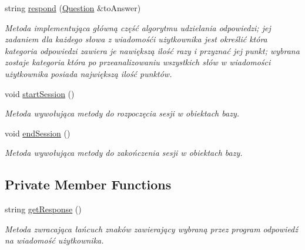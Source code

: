 \begin{DoxyCompactItemize}
$$string \mbox{\hyperlink{class_bot_a480543fe4ce73868ce89217cc1d0e8a8}{respond}} (\mbox{\hyperlink{class_question}{Question}} \&to\+Answer)
\begin{DoxyCompactList}\small\item\em Metoda implementująca główną część algorytmu udzielania odpowiedzi; jej zadaniem dla każdego słowa z wiadomośći użytkownika jest określić która kategoria odpowiedzi zawiera je nawiększą ilość razy i przyznać jej punkt; wybrana zostaje kategoria która po przeanalizowaniu wszystkich słów w wiadomości użytkownika posiada największą ilość punktów. \end{DoxyCompactList}\item 
\mbox{\label{class_bot_a35146f212ca03da9c7d56d76d1792861}} 
void \mbox{\hyperlink{class_bot_a35146f212ca03da9c7d56d76d1792861}{start\+Session}} ()
\begin{DoxyCompactList}\small\item\em Metoda wywołująca metody do rozpoczęcia sesji w obiektach bazy. \end{DoxyCompactList}\item 
\mbox{\label{class_bot_ac326a4316197563d76956801edf3fb4d}} 
void \mbox{\hyperlink{class_bot_ac326a4316197563d76956801edf3fb4d}{end\+Session}} ()
\begin{DoxyCompactList}\small\item\em Metoda wywołująca metody do zakończenia sesji w obiektach bazy. \end{DoxyCompactList}\end{DoxyCompactItemize}
\subsection*{Private Member Functions}
\begin{DoxyCompactItemize}
\item 
string \mbox{\hyperlink{class_bot_a54de4dae4778a1b25ee2ee6e9dcbfb49}{get\+Response}} ()
\begin{DoxyCompactList}\small\item\em Metoda zwracająca łańcuch znaków zawierający wybraną przez program odpowiedź na wiadomość użytkownika. \end{DoxyCompactList}\end{DoxyCompactItemize}
